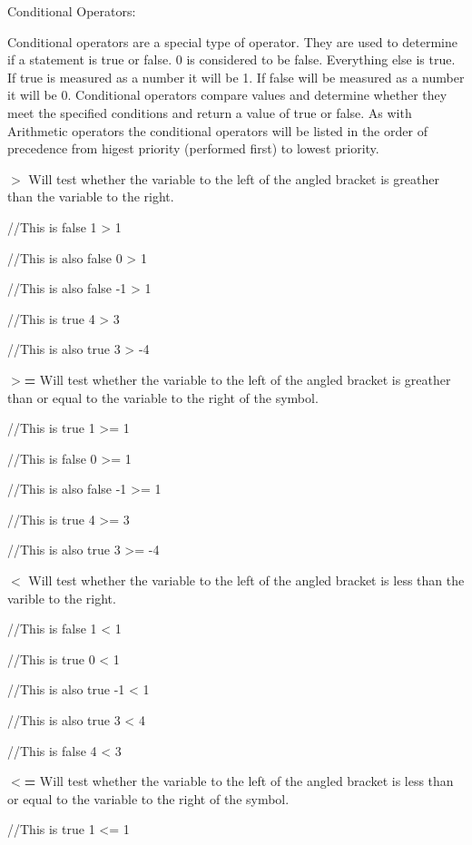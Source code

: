 Conditional Operators: \par
 Conditional operators are a special type of operator. They are used to determine if a statement is true or false. 0 is considered to be false. Everything else is true. If true is measured as a number it will be 1. If false will be measured as a number it will be 0. Conditional operators compare values and determine whether they meet the specified conditions and return a value of true or false. As with Arithmetic operators the conditional operators will be listed in the order of precedence from higest priority (performed first) to lowest priority.
\begin{DoxyItemize}
\item {\bfseries $>$} Will test whether the variable to the left of the angled bracket is greather than the variable to the right. 
\begin{DoxyCode}
 //This is false
 1 > 1

 //This is also false
 0 > 1

 //This is also false
 -1 > 1

 //This is true
 4 > 3

 //This is also true
 3 > -4
\end{DoxyCode}

\item {\bfseries $>$=} Will test whether the variable to the left of the angled bracket is greather than or equal to the variable to the right of the symbol. 
\begin{DoxyCode}
 //This is true
 1 >= 1

 //This is false
 0 >= 1

 //This is also false
 -1 >= 1

 //This is true
 4 >= 3

 //This is also true
 3 >= -4
\end{DoxyCode}

\item {\bfseries $<$} Will test whether the variable to the left of the angled bracket is less than the varible to the right. 
\begin{DoxyCode}
 //This is false
 1 < 1

 //This is true
 0 < 1

 //This is also true
 -1 < 1

 //This is also true
 3 < 4

 //This is false
 4 < 3
\end{DoxyCode}

\item {\bfseries $<$=} Will test whether the variable to the left of the angled bracket is less than or equal to the variable to the right of the symbol. 
\begin{DoxyCode}
 //This is true
 1 <= 1


\end{DoxyCode}
\end{DoxyItemize}
